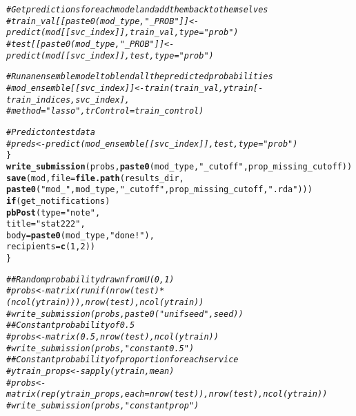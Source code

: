 \documentclass{article}\usepackage[]{graphicx}\usepackage[]{color}
\makeatletter
\newcommand{\hlnum}[1]{\textcolor[rgb]{0.686,0.059,0.569}{#1}}%
\newcommand{\hlstr}[1]{\textcolor[rgb]{0.192,0.494,0.8}{#1}}%
\newcommand{\hlcom}[1]{\textcolor[rgb]{0.678,0.584,0.686}{\textit{#1}}}%
\newcommand{\hlstd}[1]{\textcolor[rgb]{0.345,0.345,0.345}{#1}}%
\newcommand{\hlkwa}[1]{\textcolor[rgb]{0.161,0.373,0.58}{\textbf{#1}}}%
\newcommand{\hlkwc}[1]{\textcolor[rgb]{0.333,0.667,0.333}{#1}}%
\newcommand{\hlkwd}[1]{\textcolor[rgb]{0.737,0.353,0.396}{\textbf{#1}}}%
\newenvironment{kframe}{%
 \def\at@end@of@kframe{}%
 \ifinner\ifhmode%
  \def\at@end@of@kframe{\end{minipage}}%
  \begin{minipage}{\columnwidth}%
 \fi\fi%
 \def\FrameCommand##1{\hskip\@totalleftmargin \hskip-\fboxsep
 \colorbox{shadecolor}{##1}\hskip-\fboxsep
     \hskip-\linewidth \hskip-\@totalleftmargin \hskip\columnwidth}%
 \MakeFramed {\advance\hsize-\width
   \@totalleftmargin\z@ \linewidth\hsize
   \@setminipage}}%
 {\par\unskip\endMakeFramed%
 \at@end@of@kframe}
\newenvironment{knitrout}{}{} %
\makeatother
\begin{document}
\begin{knitrout}
\begin{kframe}
\begin{alltt}
    \hlcom{# Get predictions for each model and add them back to themselves}
    \hlcom{# train_val[[paste0(mod_type, "_PROB"]] <- predict(mod[[svc_index]], train_val, type = "prob")}
    \hlcom{# test[[paste0(mod_type, "_PROB"]] <- predict(mod[[svc_index]], test, type = "prob")}

    \hlcom{# Run an ensemble model to blend all the predicted probabilities}
    \hlcom{# mod_ensemble[[svc_index]] <- train(train_val, ytrain[-train_indices, svc_index], }
    \hlcom{#                                    method = "lasso", trControl = train_control)}

    \hlcom{# Predict on test data}
    \hlcom{# preds <- predict(mod_ensemble[[svc_index]], test, type = "prob")}
  \hlstd{\}}
  \hlkwd{write_submission}\hlstd{(probs,} \hlkwd{paste0}\hlstd{(mod_type,} \hlstr{"_cutoff"}\hlstd{, prop_missing_cutoff))}
  \hlkwd{save}\hlstd{(mod,} \hlkwc{file} \hlstd{=} \hlkwd{file.path}\hlstd{(results_dir,}
                             \hlkwd{paste0}\hlstd{(}\hlstr{"mod_"}\hlstd{, mod_type,} \hlstr{"_cutoff"}\hlstd{, prop_missing_cutoff,} \hlstr{".rda"}\hlstd{)))}
  \hlkwa{if} \hlstd{(get_notifications)}
    \hlkwd{pbPost}\hlstd{(}\hlkwc{type} \hlstd{=} \hlstr{"note"}\hlstd{,}
           \hlkwc{title} \hlstd{=} \hlstr{"stat222"}\hlstd{,}
           \hlkwc{body} \hlstd{=} \hlkwd{paste0}\hlstd{(mod_type,} \hlstr{" done!"}\hlstd{),}
           \hlkwc{recipients} \hlstd{=} \hlkwd{c}\hlstd{(}\hlnum{1}\hlstd{,} \hlnum{2}\hlstd{))}
\hlstd{\}}

\hlcom{# # Random probability drawn from U(0, 1)}
\hlcom{# probs <- matrix(runif(nrow(test)*(ncol(ytrain))), nrow(test), ncol(ytrain))}
\hlcom{# write_submission(probs, paste0("unifseed", seed))}
\hlcom{# # Constant probability of 0.5}
\hlcom{# probs <- matrix(0.5, nrow(test), ncol(ytrain))}
\hlcom{# write_submission(probs, "constant0.5")}
\hlcom{# # Constant probability of proportion for each service}
\hlcom{# ytrain_props <- sapply(ytrain, mean)}
\hlcom{# probs <- matrix(rep(ytrain_props, each = nrow(test)), nrow(test), ncol(ytrain))}
\hlcom{# write_submission(probs, "constantprop")}
\end{alltt}
\end{kframe}
\end{knitrout}
\end{document}
